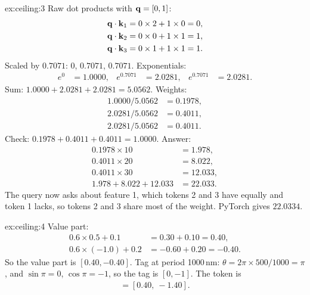 \begin{solution}{ex:ceiling:3}
Raw dot products with $\mathbf{q} = [0, 1]$:
\begin{align*}
  \mathbf{q}\cdot\mathbf{k}_1 &= 0\times2 + 1\times0 = 0,\\
  \mathbf{q}\cdot\mathbf{k}_2 &= 0\times0 + 1\times1 = 1,\\
  \mathbf{q}\cdot\mathbf{k}_3 &= 0\times1 + 1\times1 = 1.
\end{align*}
Scaled by $0.7071$: $0$, $0.7071$, $0.7071$. Exponentials:
\begin{align*}
  e^{0} &= 1.0000, & e^{0.7071} &= 2.0281, & e^{0.7071} &= 2.0281 .
\end{align*}
Sum: $1.0000 + 2.0281 + 2.0281 = 5.0562$. Weights:
\begin{align*}
  1.0000/5.0562 &= 0.1978,\\
  2.0281/5.0562 &= 0.4011,\\
  2.0281/5.0562 &= 0.4011 .
\end{align*}
Check: $0.1978 + 0.4011 + 0.4011 = 1.0000$. Answer:
\begin{align*}
  0.1978\times10 &= 1.978,\\
  0.4011\times20 &= 8.022,\\
  0.4011\times30 &= 12.033,\\
  1.978 + 8.022 + 12.033 &= 22.033 .
\end{align*}
The query now asks about feature 1, which tokens 2 and 3 have equally and token 1 lacks, so tokens 2 and 3 share most of the weight. PyTorch gives $22.0334$.
\end{solution}

\begin{solution}{ex:ceiling:4}
Value part:
\begin{align*}
  0.6\times0.5 + 0.1 &= 0.30 + 0.10 = 0.40,\\
  0.6\times(-1.0) + 0.2 &= -0.60 + 0.20 = -0.40 .
\end{align*}
So the value part is $[0.40, -0.40]$. Tag at period 1000\,nm: $\theta = 2\pi\times500/1000 = \pi$, and $\sin\pi = 0$, $\cos\pi = -1$, so the tag is $[0, -1]$. The token is
\begin{align*}
  [0.40 + 0,\ -0.40 + (-1)] = [0.40,\ -1.40] .
\end{align*}
\end{solution}

